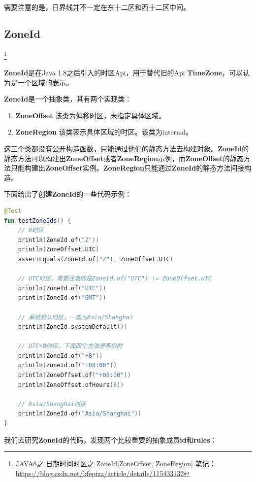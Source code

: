 \documentclass[cn,10pt,math=newtx,citestyle=gb7714-2015,bibstyle=gb7714-2015]{elegantbook}
\begin{document}
    \begin{note}
        需要注意的是，日界线并不一定在东十二区和西十二区中间。
    \end{note}

    \subsection{ZoneId}

    \footnote{
        JAVA8之 日期时间时区之 ZoneId[ZoneOffset, ZoneRegion] 笔记：\url{https://blog.csdn.net/kfepiza/article/details/115433132}
    }

    \textbf{ZoneId}是在Java 1.8之后引入的时区Api，用于替代旧的Api \textbf{TimeZone}，可以认为是一个区域的表示。

    \textbf{ZoneId}是一个抽象类，其有两个实现类：
    \begin{enumerate}
        \item \textbf{ZoneOffset} 该类为偏移时区，未指定具体区域。
        \item \textbf{ZoneRegion} 该类表示具体区域的时区。该类为internal。
    \end{enumerate}

    这三个类都没有公开构造函数，只能通过他们的静态方法去构建对象。\textbf{ZoneId}的静态方法可以构建出\textbf{ZoneOffset}或者\textbf{ZoneRegion}示例，而\textbf{ZoneOffset}的静态方法只能构建出\textbf{ZoneOffset}实例。\textbf{ZoneRegion}只能通过\textbf{ZoneId}的静态方法间接构造。

    下面给出了创建\textbf{ZoneId}的一些代码示例：

    \begin{lstlisting}[language=Kotlin]
@Test
fun testZoneIds() {
    // 0时区
    println(ZoneId.of("Z"))
    println(ZoneOffset.UTC)
    assertEquals(ZoneId.of("Z"), ZoneOffset.UTC)

    // UTC时区，需要注意的是ZoneId.of("UTC") != ZoneOffset.UTC
    println(ZoneId.of("UTC"))
    println(ZoneId.of("GMT"))
    
    // 系统默认时区，一般为Asia/Shanghai
    println(ZoneId.systemDefault())

    // UTC+8时区，下面四个方法是等价的
    println(ZoneId.of("+8"))
    println(ZoneId.of("+08:00"))
    println(ZoneOffset.of("+08:00"))
    println(ZoneOffset.ofHours(8))

    // Asia/Shanghai时区
    println(ZoneId.of("Asia/Shanghai"))
}
    \end{lstlisting}

    我们去研究\textbf{ZoneId}的代码，发现两个比较重要的抽象成员\textbf{id}和\textbf{rules}：
\end{document}
